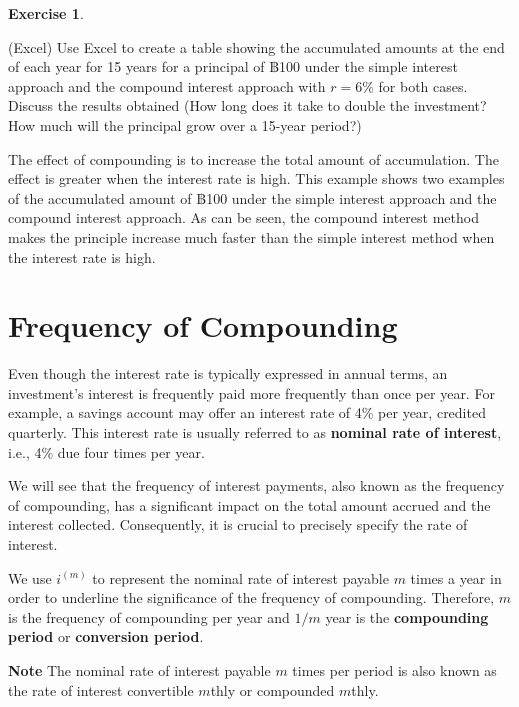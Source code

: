 \documentclass[landscape, 20pt]{extreport}
\theoremstyle{definition}
\theoremstyle{definition}
\theoremstyle{definition}
\newtheorem{exercise}{Exercise}[chapter]
\theoremstyle{definition}
\theoremstyle{remark}
\begin{document}
\begin{exercise}
\protect\hypertarget{exr:unlabeled-div-4}{}\label{exr:unlabeled-div-4}

(Excel) Use Excel to create a table showing the accumulated amounts at the end of each year for 15 years for a principal of ฿100 under the simple interest approach and the compound interest approach with \(r = 6\%\) for both cases.
Discuss the results obtained (How long does it take to double the investment? How much will the principal grow over a 15-year period?)

\end{exercise}

The effect of compounding is to increase the total amount of accumulation. The effect is greater when the interest rate is high. This example shows two examples of the accumulated amount of ฿100 under the simple interest approach and the compound interest approach. As can be seen, the compound interest method makes the principle increase much faster than the simple interest method when the interest rate is high.

\hypertarget{frequency-of-compounding}{%
\newpage \section{Frequency of Compounding}\label{frequency-of-compounding}}

Even though the interest rate is typically expressed in annual terms, an investment's interest is frequently paid more frequently than once per year. For example, a savings account may offer an interest rate of 4\% per year, credited quarterly. This interest rate is usually referred to as \textbf{nominal rate of interest}, i.e., 4\% due four times per year.

We will see that the frequency of interest payments, also known as the frequency of compounding, has a significant impact on the total amount accrued and the interest collected. Consequently, it is crucial to precisely specify the rate of interest.

We use \(i^{(m)}\) to represent the nominal rate of interest payable \(m\) times a year in order to underline the significance of the frequency of compounding. Therefore, \(m\) is the
frequency of compounding per year and \(1/m\) year is the \textbf{compounding period} or \textbf{conversion period}.

\textbf{Note} The nominal rate of interest payable \(m\) times per period is also known as the rate of interest convertible \(m\)thly or compounded \(m\)thly.
\end{document}
